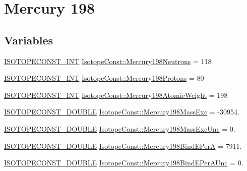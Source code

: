 \hypertarget{group___isotope_const-_mercury-_hg198}{}\section{Mercury 198}
\label{group___isotope_const-_mercury-_hg198}
\subsection*{Variables}
\begin{DoxyCompactItemize}
\item 
\mbox{\hyperlink{group___isotope_const-_macros_ga5f18360b3e99483a35c32d789e62621c}{I\+S\+O\+T\+O\+P\+E\+C\+O\+N\+S\+T\+\_\+\+I\+NT}} \mbox{\hyperlink{group___isotope_const-_mercury-_hg198_gaec39eb80fe1f2061df1e455cb178f3a4}{Isotope\+Const\+::\+Mercury198\+Neutrons}} = 118
\item 
\mbox{\hyperlink{group___isotope_const-_macros_ga5f18360b3e99483a35c32d789e62621c}{I\+S\+O\+T\+O\+P\+E\+C\+O\+N\+S\+T\+\_\+\+I\+NT}} \mbox{\hyperlink{group___isotope_const-_mercury-_hg198_ga190293b22c605f8b932d528d9ba2a218}{Isotope\+Const\+::\+Mercury198\+Protons}} = 80
\item 
\mbox{\hyperlink{group___isotope_const-_macros_ga5f18360b3e99483a35c32d789e62621c}{I\+S\+O\+T\+O\+P\+E\+C\+O\+N\+S\+T\+\_\+\+I\+NT}} \mbox{\hyperlink{group___isotope_const-_mercury-_hg198_gaf79b1818f60f8931a6afe5ef8ccdd628}{Isotope\+Const\+::\+Mercury198\+Atomic\+Weight}} = 198
\item 
\mbox{\hyperlink{group___isotope_const-_macros_ga8f45a7272ce02c0b4c65c44636ed719a}{I\+S\+O\+T\+O\+P\+E\+C\+O\+N\+S\+T\+\_\+\+D\+O\+U\+B\+LE}} \mbox{\hyperlink{group___isotope_const-_mercury-_hg198_ga3bdd3643ddcd53d09353b7bbf0459bc5}{Isotope\+Const\+::\+Mercury198\+Mass\+Exc}} = -\/30954.
\item 
\mbox{\hyperlink{group___isotope_const-_macros_ga8f45a7272ce02c0b4c65c44636ed719a}{I\+S\+O\+T\+O\+P\+E\+C\+O\+N\+S\+T\+\_\+\+D\+O\+U\+B\+LE}} \mbox{\hyperlink{group___isotope_const-_mercury-_hg198_gadf3f80f6f09a7de570c0424e45356b7e}{Isotope\+Const\+::\+Mercury198\+Mass\+Exc\+Unc}} = 0.
\item 
\mbox{\hyperlink{group___isotope_const-_macros_ga8f45a7272ce02c0b4c65c44636ed719a}{I\+S\+O\+T\+O\+P\+E\+C\+O\+N\+S\+T\+\_\+\+D\+O\+U\+B\+LE}} \mbox{\hyperlink{group___isotope_const-_mercury-_hg198_gaafd1d77f90730f3fe830d0163eb5ba05}{Isotope\+Const\+::\+Mercury198\+Bind\+E\+PerA}} = 7911.
\item 
\mbox{\hyperlink{group___isotope_const-_macros_ga8f45a7272ce02c0b4c65c44636ed719a}{I\+S\+O\+T\+O\+P\+E\+C\+O\+N\+S\+T\+\_\+\+D\+O\+U\+B\+LE}} \mbox{\hyperlink{group___isotope_const-_mercury-_hg198_gaa326d8f171e72cd98854b1e2cba68446}{Isotope\+Const\+::\+Mercury198\+Bind\+E\+Per\+A\+Unc}} = 0.

\end{DoxyCompactItemize}
